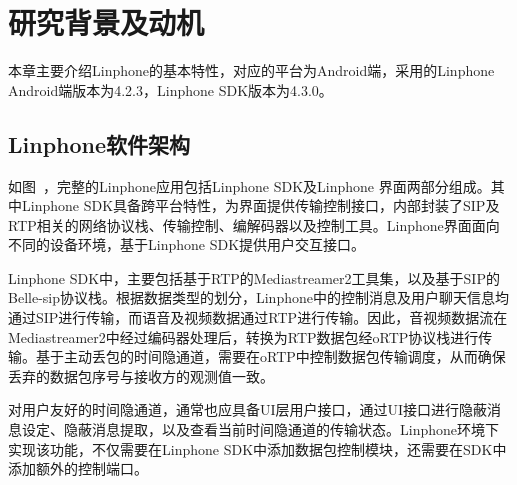 \section{研究背景及动机}
\label{chap:linphone:motivation}

本章主要介绍Linphone的基本特性，对应的平台为Android端，采用的Linphone Android端版本为4.2.3，Linphone SDK版本为4.3.0。

\subsection{Linphone软件架构}
\label{chap:linphone:motivation:struct}


如图\ ，完整的Linphone应用包括Linphone SDK及Linphone 界面两部分组成。其中Linphone SDK具备跨平台特性，为界面提供传输控制接口，内部封装了SIP及RTP相关的网络协议栈、传输控制、编解码器以及控制工具。Linphone界面面向不同的设备环境，基于Linphone SDK提供用户交互接口。

Linphone SDK中，主要包括基于RTP的Mediastreamer2工具集，以及基于SIP的Belle-sip协议栈。根据数据类型的划分，Linphone中的控制消息及用户聊天信息均通过SIP进行传输，而语音及视频数据通过RTP进行传输。因此，音视频数据流在Mediastreamer2中经过编码器处理后，转换为RTP数据包经oRTP协议栈进行传输。基于主动丢包的时间隐通道，需要在oRTP中控制数据包传输调度，从而确保丢弃的数据包序号与接收方的观测值一致。

对用户友好的时间隐通道，通常也应具备UI层用户接口，通过UI接口进行隐蔽消息设定、隐蔽消息提取，以及查看当前时间隐通道的传输状态。Linphone环境下实现该功能，不仅需要在Linphone SDK中添加数据包控制模块，还需要在SDK中添加额外的控制端口。

